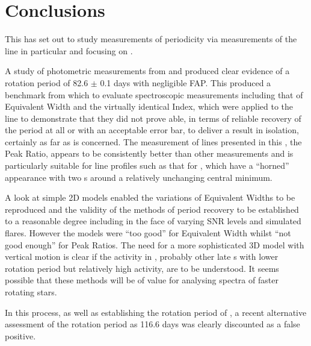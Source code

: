 \chapter{Conclusions}
\protect\label{chapter:conclusions}

This {\paperorthesis} has set out to study measurements of periodicity via measurements of the {\ha} line in particular
and focusing on \prox.

A study of photometric measurements from {\asas} and {\hst} produced clear evidence of a rotation period of 82.6 $\pm$
0.1 days with negligible FAP. This produced a benchmark from which to evaluate spectroscopic measurements including that
of Equivalent Width and the virtually identical {\ha} Index, which were applied to the {\ha} line to demonstrate that
they did not prove able, in terms of reliable recovery of the period at all or with an acceptable error bar, to deliver
a result in isolation, certainly as far as {\prox} is concerned. The measurement of lines presented in this
\paperorthesis, the Peak Ratio, appears to be consistently better than other measurements and is particularly suitable
for {\ha} line profiles such as that for \prox, which have a ``horned'' appearance with two \horn s around a relatively
unchanging central minimum.

A look at simple 2D models enabled the variations of Equivalent Widths to be reproduced and the validity of the methods
of period recovery to be established to a reasonable degree including in the face of varying SNR levels and simulated
flares. However the models were ``too good'' for Equivalent Width whilst ``not good enough'' for Peak Ratios. The need
for a more sophisticated 3D model with vertical motion is clear if the activity in \prox, probably other late \rdwarf s
with lower rotation period but relatively high activity, are to be understood. It seems possible that these methods will
be of value for analysing spectra of faster rotating stars.

In this process, as well as establishing the rotation period of \prox, a recent alternative assessment of the rotation
period as 116.6 days was clearly discounted as a false positive.

